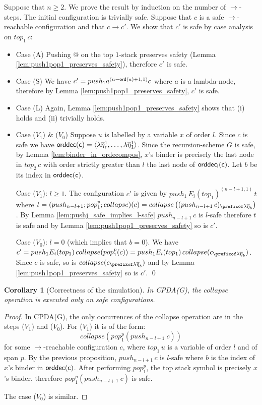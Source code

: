 \documentclass[a4paper]{article}
\newtheorem{corollary}[theorem]{Corollary}
\theoremstyle{remark}
\theoremstyle{definition}
\newcommand\orddec{\sf orddec}
\begin{document}
Suppose that $n\geq 2$. We prove the result by induction on the number of
$\rightarrow$-steps. The initial configuration is trivially safe.
Suppose that $c$ is a safe $\rightarrow$-reachable configuration and that
$c \rightarrow c'$.
We show that $c'$ is safe by case analysis on $top_1\,c$:
\begin{itemize}
\item Case (A) Pushing @ on the top $1$-stack preserves safety (Lemma
\ref{lem:push1pop1_preserves_safety}), therefore $c'$ is safe.

\item Case (S)
We have $c' = push_1 a^{(n-{\sf ord}(a)+1,1)} c$ where $a$ is a
lambda-node, therefore by Lemma \ref{lem:push1pop1_preserves_safety},
$c'$ is safe.

\item Case (L) Again, Lemma \ref{lem:push1pop1_preserves_safety}
shows that (i) holds and (ii) trivially holds.

\item Case ($V_1$) \& ($V_0$) Suppose $u$ is labelled by a variable $x$ of order $l$.
Since $c$ is safe we have $\orddec(c) = \langle \lambda
\overline{\eta}_r^1 , \ldots, \lambda \overline{\eta}_1^1
\rangle$. Since the recursion-scheme $G$ is safe, by Lemma \ref{lem:binder_in_ordecompos}, $x$'s binder is precisely the
last node in $top_2\, c$ with order strictly greater than $l$ \ie the last node of $\orddec_l(c)$. Let $b$ be its index in $\orddec(c)$.


Case ($V_1$): $l\geq 1$.
The configuration $c'$ is given by $push_1\, E_i(top_1)^{(n-l+1,1)}\, t$ where
$t = (push_{n-l+1};pop_1^p;collapse)(c) = collapse \left( (push_{n-l+1}\,c)_{\prefixof \lambda
\overline{\eta}_{b}} \right)$.
By Lemma \ref{lem:pushj_safe_implies_l-safe} $push_{n-l+1}\, c$ is $l$-safe therefore
$t$ is safe and by Lemma \ref{lem:push1pop1_preserves_safety} so is $c'$.

Case ($V_0$): $l=0$ (which implies that  $b=0$). We have $c' = push_1 E_i(top_1)\,collapse(pop_1^p(c)) =
push_1 E_i(top_1)\,collapse(c_{\prefixof \lambda \overline\eta_b})$.
Since $c$ is safe, so is $collapse(c_{\prefixof \lambda \overline\eta_b})$ and
by Lemma \ref{lem:push1pop1_preserves_safety} so is $c'$.
\qed
\end{itemize}
\smallskip

\begin{corollary}[Correctness of the simulation] \hfill
In CPDA(G), the $collapse$ operation is executed only on safe configurations.
\end{corollary}
\begin{proof}
In CPDA(G), the only occurrences of the collapse operation are in the steps ($V_1$) and ($V_0$). For ($V_1$) it is of the form:
$$ collapse(pop_1^p(push_{n-l+1}~c))$$
for some $\rightarrow$-reachable configuration $c$, where $top_1\,u$ is a variable of order $l$ and of span $p$. By the previous proposition,
$push_{n-l+1}\,c$ is $l$-safe where $b$ is the index of $x$'s binder in $\orddec(c)$. After performing $pop_1^p$, the top stack symbol is precisely $x$'s binder, therefore $pop^p_1(push_{n-l+1}~c)$ is safe.

The case ($V_0$) is similar.
\end{proof}
\end{document}
